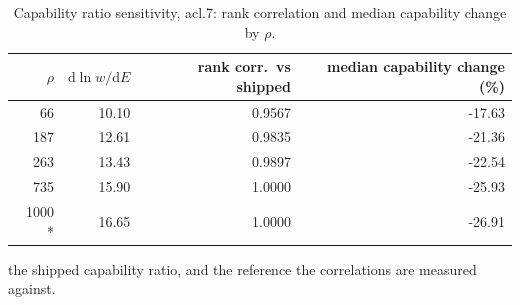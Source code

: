 \begin{table}[htbp]
  \centering
  \caption{Capability ratio sensitivity, acl.7: rank correlation and median capability change by $\rho$.}
  \label{tab:rho-acl-7-summary}
  \begin{tabular}{r r r r}
    \toprule
    $\rho$ & $\mathrm{d}\ln w/\mathrm{d}E$ & rank corr.\ vs shipped & median capability change (\%) \\
    \midrule
    66 & 10.10 & 0.9567 & -17.63 \\
    187 & 12.61 & 0.9835 & -21.36 \\
    263 & 13.43 & 0.9897 & -22.54 \\
    735 & 15.90 & 1.0000 & -25.93 \\
    1000 * & 16.65 & 1.0000 & -26.91 \\
    \bottomrule
  \end{tabular}
  \par\smallskip\footnotesize * the shipped capability ratio, and the reference the correlations are measured against.
\end{table}

